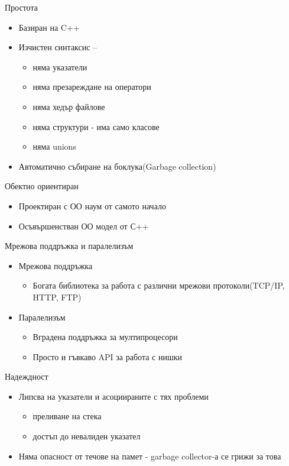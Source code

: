 \documentclass{beamer}
\begin{document}
\begin{frame}{Простота}
  \transdissolve  
  \begin{itemize}
    \item Базиран на C++
    \item Изчистен синтаксис – 
      \begin{itemize}
        \item няма указатели
        \item няма презареждане на оператори
        \item няма хедър файлове
        \item няма структури - има само класове
        \item няма unions
      \end{itemize}
    \item Автоматично събиране на боклука(Garbage collection)
  \end{itemize}
\end{frame}

\begin{frame}{Обектно ориентиран}
  \transdissolve
  \begin{itemize}
  \item Проектиран с ОО наум от самото начало
  \item Осъвършенстван ОО модел от С++
  \end{itemize}
\end{frame}

\begin{frame}{Мрежова поддръжка и паралелизъм}
  \transdissolve
  \begin{itemize}
  \item Мрежова поддръжка
  \begin{itemize}
  \item Богата библиотека за работа с различни
    мрежови протоколи(TCP/IP, HTTP, FTP)
  \end{itemize}
  \item Паралелизъм
    \begin{itemize}
    \item Вградена поддръжка за мултипроцесори
    \item Просто и гъвкаво API за работа с нишки
    \end{itemize}
  \end{itemize}
\end{frame}

\begin{frame}{Надеждност}
  \transdissolve
  \begin{itemize}
    \item Липсва на указатели и асоциираните с
    тях проблеми
    \begin{itemize}
      \item преливане на стека
      \item достъп до невалиден указател
    \end{itemize}

    \item Няма опасност от течове на памет - 
    garbage collector-а се грижи за това
  \end{itemize}
\end{frame}
\end{document}
